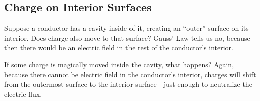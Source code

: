 \documentclass[../PhysicsFormulae.tex]{subfiles}
\begin{document}
\subsection{Charge on Interior Surfaces}
Suppose a conductor has a cavity inside of it, creating an ``outer'' surface on its interior. Does charge also move to that surface? Gauss' Law tells us no, because then there would be an electric field in the rest of the conductor's interior. \bigskip

If some charge is magically moved inside the cavity, what happens? Again, because there cannot be electric field in the conductor's interior, charges will shift from the outermost surface to the interior surface---just enough to neutralize the electric flux. 
\end{document}
